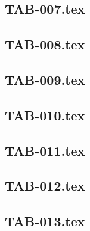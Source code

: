 \subsection*{\xxexo} 
\graphicspath{{../../exos/tableaux/TAB-006/}}
 
 
\renewcommand{\xxexo}{TAB-007.tex} 
\subsection*{\xxexo} 
\graphicspath{{../../exos/tableaux/TAB-007/}}
 
 
\renewcommand{\xxexo}{TAB-008.tex} 
\subsection*{\xxexo} 
\graphicspath{{../../exos/tableaux/TAB-008/}}
 
 
\renewcommand{\xxexo}{TAB-009.tex} 
\subsection*{\xxexo} 
\graphicspath{{../../exos/tableaux/TAB-009/}}
 
 
\renewcommand{\xxexo}{TAB-010.tex} 
\subsection*{\xxexo} 
\graphicspath{{../../exos/tableaux/TAB-010/}}
 
 
\renewcommand{\xxexo}{TAB-011.tex} 
\subsection*{\xxexo} 
\graphicspath{{../../exos/tableaux/TAB-011/}}
 
 
\renewcommand{\xxexo}{TAB-012.tex} 
\subsection*{\xxexo} 
\graphicspath{{../../exos/tableaux/TAB-012/}}
 
 
\renewcommand{\xxexo}{TAB-013.tex} 
\subsection*{\xxexo} 
\graphicspath{{../../exos/tableaux/TAB-013/}}
 
 
